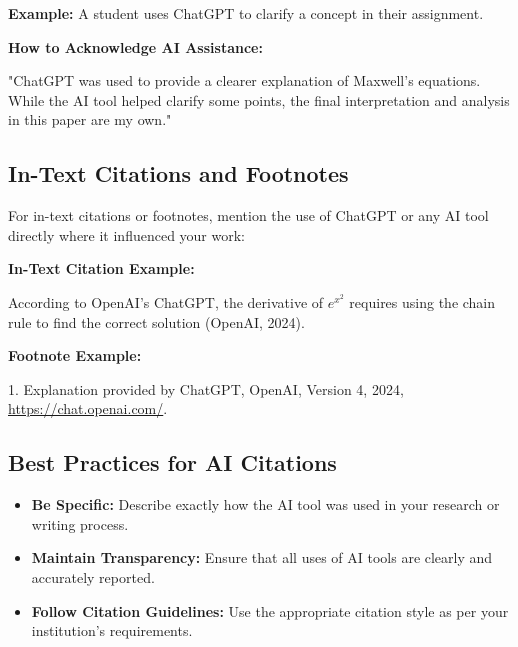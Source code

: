 \documentclass{article}
\begin{document}
\textbf{Example:} A student uses ChatGPT to clarify a concept in their assignment.

\textbf{How to Acknowledge AI Assistance:}

\begin{mdframed}
\begin{flushleft}
"ChatGPT was used to provide a clearer explanation of Maxwell’s equations. While the AI tool helped clarify some points, the final interpretation and analysis in this paper are my own."
\end{flushleft}
\end{mdframed}

\subsection{In-Text Citations and Footnotes}

For in-text citations or footnotes, mention the use of ChatGPT or any AI tool directly where it influenced your work:

\textbf{In-Text Citation Example:}

\begin{mdframed}
\begin{flushleft}
According to OpenAI’s ChatGPT, the derivative of \(e^{x^2}\) requires using the chain rule to find the correct solution (OpenAI, 2024).
\end{flushleft}
\end{mdframed}

\textbf{Footnote Example:}

\begin{mdframed}
\begin{flushleft}
1. Explanation provided by ChatGPT, OpenAI, Version 4, 2024, \url{https://chat.openai.com/}.
\end{flushleft}
\end{mdframed}

\subsection{Best Practices for AI Citations}

\begin{itemize}
    \item \textbf{Be Specific:} Describe exactly how the AI tool was used in your research or writing process.
    \item \textbf{Maintain Transparency:} Ensure that all uses of AI tools are clearly and accurately reported.
    \item \textbf{Follow Citation Guidelines:} Use the appropriate citation style as per your institution’s requirements.
\end{itemize}
\end{document}
